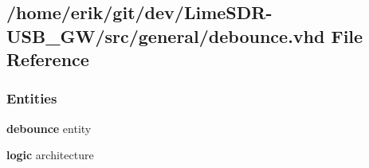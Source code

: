 \subsection{/home/erik/git/dev/\+Lime\+S\+D\+R-\/\+U\+S\+B\+\_\+\+G\+W/src/general/debounce.vhd File Reference}
\label{debounce_8vhd}
\subsubsection*{Entities}
\begin{DoxyCompactItemize}
\item 
{\bf debounce} entity
\item 
{\bf logic} architecture
\end{DoxyCompactItemize}
